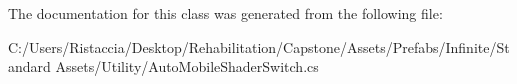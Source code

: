 The documentation for this class was generated from the following file\+:\begin{DoxyCompactItemize}
\item 
C\+:/\+Users/\+Ristaccia/\+Desktop/\+Rehabilitation/\+Capstone/\+Assets/\+Prefabs/\+Infinite/\+Standard Assets/\+Utility/Auto\+Mobile\+Shader\+Switch.\+cs\end{DoxyCompactItemize}
